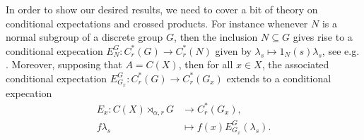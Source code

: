 In order to show our desired results, we need to cover a bit of theory on conditional expectations and crossed products. For instance whenever $N$ is a normal subgroup of a discrete group $G$, then the inclusion $N \subseteq G$ gives rise to a conditional expecation $E_{N}^G \colon C_r^*(G) \to C_r^*(N)$ given by $\lambda_s \mapsto 1_{N}(s) \lambda_s$, see e.g. \cite[Corollary 2.5.12]{brown2008c}. Moreover, supposing that $A = C(X)$, then for all $x \in X$, the associated conditional expectation $E_{G_x}^G \colon C_r^* (G) \to C_r^*(G_x)$ extends to a conditional expecation
\begin{align}
	E_x \colon C(X) \rtimes_{\alpha,r} G &\to C_r^*(G_x), \\
	f \lambda_s &\mapsto f(x) E_{G_x}^G(\lambda_s).
	\label{eq:stabcond}
\end{align}

